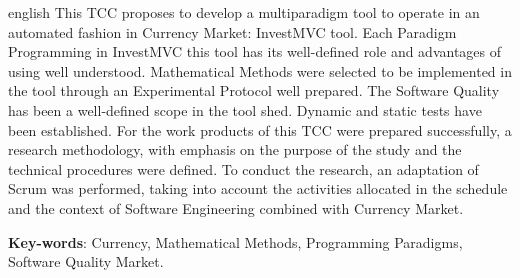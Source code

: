 \begin{resumo}[Abstract]
 \begin{otherlanguage*}{english}
This TCC proposes to develop a multiparadigm tool to operate in an automated fashion in Currency Market: InvestMVC tool. Each Paradigm Programming in InvestMVC this tool has its well-defined role and advantages of using well understood. Mathematical Methods were selected to be implemented in the tool through an Experimental Protocol well prepared. The Software Quality has been a well-defined scope in the tool shed. Dynamic and static tests have been established. For the work products of this TCC were prepared successfully, a research methodology, with emphasis on the purpose of the study and the technical procedures were defined. To conduct the research, an adaptation of Scrum was performed, taking into account the activities allocated in the schedule and the context of Software Engineering combined with Currency Market.
   \vspace{\onelineskip}
 
   \noindent 
   \textbf{Key-words}: Currency, Mathematical Methods, Programming Paradigms, Software Quality Market.
 \end{otherlanguage*}
\end{resumo}
